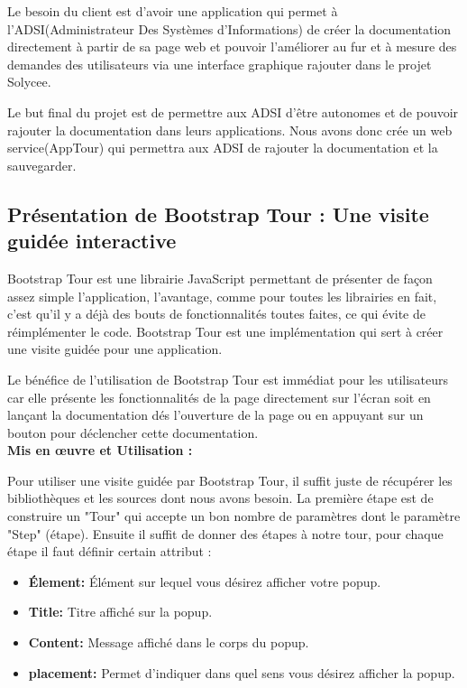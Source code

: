 \documentclass[12pt]{article}
\begin{document}
Le besoin du client est d'avoir une application qui permet à l'ADSI(Administrateur Des Systèmes d'Informations) de créer la documentation directement à partir de sa page web et pouvoir l'améliorer au fur et à mesure des demandes des utilisateurs via une interface graphique rajouter dans le projet Solycee. 


Le but final du projet est de permettre aux ADSI d'être autonomes et de pouvoir rajouter la documentation dans leurs applications. Nous avons donc crée un web service(AppTour) qui permettra aux ADSI de rajouter la documentation et la sauvegarder. 
 
\subsection{Présentation de Bootstrap Tour : Une visite guidée interactive}
 
Bootstrap Tour est une librairie JavaScript permettant de présenter de façon assez simple l’application, l’avantage, comme pour toutes les librairies en fait, c’est qu’il y a déjà des bouts de fonctionnalités toutes faites, ce qui évite de réimplémenter le code. Bootstrap Tour est une implémentation qui sert à créer une visite guidée pour une application.

Le bénéfice de l'utilisation de Bootstrap Tour est immédiat pour les utilisateurs car elle présente les fonctionnalités de la page directement sur l'écran soit en lançant la documentation  dés l'ouverture de la page ou en appuyant sur un bouton pour déclencher cette documentation.\\
\textbf{Mis en œuvre et  Utilisation :}

Pour utiliser une visite guidée par Bootstrap Tour, il suffit juste de récupérer les bibliothèques et les sources dont nous avons besoin. La première étape est de construire un "Tour" qui accepte un bon nombre de paramètres dont le paramètre "Step" (étape). Ensuite il suffit de donner des étapes à notre tour, pour chaque étape il faut définir certain attribut : 

\begin{itemize}
\item \textbf{Élement: } Élément sur lequel vous désirez afficher votre popup. 
\item \textbf{Title: } Titre affiché sur la popup. 
\item \textbf{Content: } Message affiché dans le corps du popup.
\item \textbf{placement: } Permet d’indiquer dans quel sens vous désirez afficher la popup.
\end{itemize} 
\end{document}
